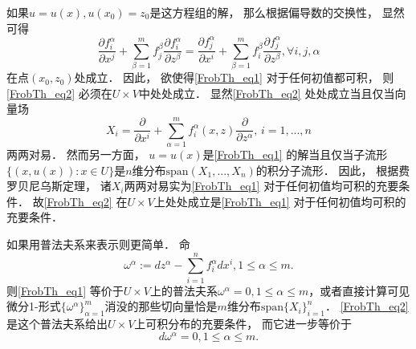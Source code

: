 如果$u=u(x),u(x_0)=z_0$是这方程组的解， 那么根据偏导数的交换性， 显然可得
\begin{equation}\label{FrobTh_eq2}
\frac{\partial f_i^\alpha}{\partial x^j}+\sum_{\beta=1}^mf_j^\beta\frac{\partial f_i^\alpha}{\partial z^\beta}
=\frac{\partial f_j^\alpha}{\partial x^i}+\sum_{\beta=1}^mf_i^\beta\frac{\partial f_j^\alpha}{\partial z^\beta},\forall i,j,\alpha
\end{equation}
在点$(x_0,z_0)$处成立． 因此， 欲使得\autoref{FrobTh_eq1} 对于任何初值都可积， 则\autoref{FrobTh_eq2} 必须在$U\times V$中处处成立． 显然\autoref{FrobTh_eq2} 处处成立当且仅当向量场
$$
X_i=\frac{\partial}{\partial x^i}+\sum_{\alpha=1}^mf_i^\alpha(x,z)\frac{\partial}{\partial z^\alpha},\,i=1,...,n
$$
两两对易． 然而另一方面， $u=u(x)$是\autoref{FrobTh_eq1} 的解当且仅当子流形$\{(x,u(x)):x\in U\}$是$n$维分布$\text{span}(X_1,...,X_n)$的积分子流形． 因此， 根据费罗贝尼乌斯定理， 诸$X_i$两两对易实为\autoref{FrobTh_eq1} 对于任何初值均可积的充要条件． 故\autoref{FrobTh_eq2} 在$U\times V$上处处成立是\autoref{FrobTh_eq1} 对于任何初值均可积的充要条件．

如果用普法夫系来表示则更简单． 命
\begin{equation}\label{FrobTh_eq3}
\omega^\alpha:=dz^\alpha-\sum_{i=1}^nf_i^\alpha dx^i,1\leq\alpha\leq m.
\end{equation}
则\autoref{FrobTh_eq1} 等价于$U\times V$上的普法夫系$\omega^\alpha=0,1\leq\alpha\leq m$，或者直接计算可见微分1-形式$\{\omega^\alpha\}_{\alpha=1}^m$消没的那些切向量恰是$m$维分布$\text{span}\{X_i\}_{i=1}^n$． \autoref{FrobTh_eq2} 是这个普法夫系给出$U\times V$上可积分布的充要条件， 而它进一步等价于
$$
d\omega^\alpha=0,1\leq\alpha\leq m.
$$
